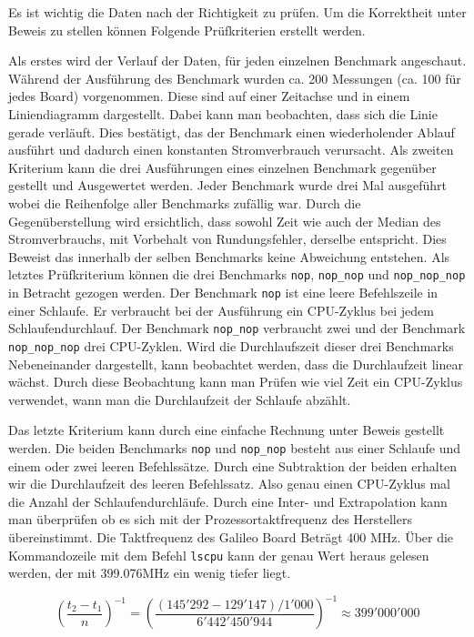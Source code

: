 Es ist wichtig die Daten nach der Richtigkeit zu prüfen. Um die Korrektheit unter Beweis zu stellen können Folgende Prüfkriterien erstellt werden.
\par
Als erstes wird der Verlauf der Daten, für jeden einzelnen Benchmark angeschaut. Während der Ausführung des Benchmark wurden ca. 200 Messungen (ca. 100 für jedes Board) vorgenommen. Diese sind auf einer Zeitachse und in einem Liniendiagramm dargestellt. Dabei kann man beobachten, dass sich die Linie gerade verläuft. Dies bestätigt, das der Benchmark einen wiederholender Ablauf ausführt und dadurch einen konstanten Stromverbrauch verursacht. Als zweiten Kriterium kann die drei Ausführungen eines einzelnen Benchmark gegenüber gestellt und Ausgewertet werden. Jeder Benchmark wurde drei Mal ausgeführt wobei die Reihenfolge aller Benchmarks zufällig war. Durch die Gegenüberstellung wird ersichtlich, dass sowohl Zeit wie auch der Median des Stromverbrauchs, mit Vorbehalt von Rundungsfehler, derselbe entspricht. Dies Beweist das innerhalb der selben Benchmarks keine Abweichung entstehen. Als letztes Prüfkriterium können die drei Benchmarks \texttt{nop}, \texttt{nop\_nop} und \texttt{nop\_nop\_nop} in Betracht gezogen werden. Der Benchmark \texttt{nop} ist eine leere Befehlszeile in einer Schlaufe. Er verbraucht bei der Ausführung ein CPU-Zyklus bei jedem Schlaufendurchlauf. Der Benchmark \texttt{nop\_nop} verbraucht zwei und der Benchmark \texttt{nop\_nop\_nop} drei CPU-Zyklen. Wird die Durchlaufszeit dieser drei Benchmarks Nebeneinander dargestellt, kann beobachtet werden, dass die Durchlaufzeit linear wächst. Durch diese Beobachtung kann man Prüfen wie viel Zeit ein CPU-Zyklus verwendet, wann man die Durchlaufzeit der Schlaufe abzählt.
\par
Das letzte Kriterium kann durch eine einfache Rechnung unter Beweis gestellt werden. Die beiden Benchmarks \texttt{nop} und \texttt{nop\_nop} besteht aus einer Schlaufe und einem oder zwei leeren Befehlssätze. Durch eine Subtraktion der beiden erhalten wir die Durchlaufzeit des leeren Befehlssatz. Also genau einen CPU-Zyklus mal die Anzahl der Schlaufendurchläufe. Durch eine Inter- und Extrapolation kann man überprüfen ob es sich mit der Prozessortaktfrequenz des Herstellers übereinstimmt. Die Taktfrequenz des Galileo Board Beträgt 400 MHz. Über die Kommandozeile mit dem Befehl \texttt{lscpu} kann der genau Wert heraus gelesen werden, der mit 399.076MHz ein wenig tiefer liegt.

\[ \left(\frac{t_2-t_1}{n}\right)^{-1} =  \left(\frac{(145'292-129'147)/1'000}{6'442'450'944}\right)^{-1} \approx 399'000'000 \]

